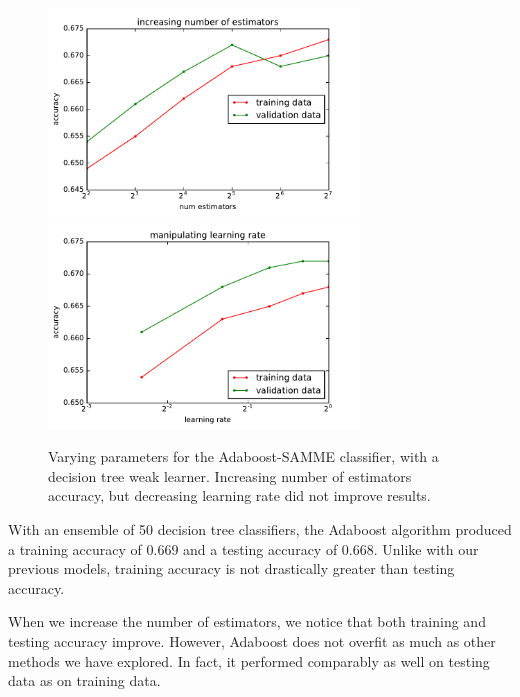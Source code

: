 \documentclass{article}
\newcommand\halfwidth{3.25in}
\begin{document}
\begin{multicols}{2}
\begin{figure}[t]
   \centering
   \includegraphics[width=\halfwidth]{img/adaB-numEstimators.pdf}\hspace{-.1in}
   \includegraphics[width=\halfwidth]{img/adaB-learningRate.pdf}
   \caption{Varying parameters for the Adaboost-SAMME classifier,
   with a decision tree weak learner.
   Increasing number of estimators accuracy,
   but decreasing learning rate did not improve results.
   }
   \label{fig:adaB-params}
\end{figure}

With an ensemble of 50 decision tree classifiers,
the Adaboost algorithm produced
a training accuracy of 0.669
and a testing accuracy of 0.668.
Unlike with our previous models,
training accuracy is not drastically greater than
testing accuracy.

When we increase the number of estimators,
we notice that both training and testing accuracy improve.
However, Adaboost does not overfit
as much as other methods we have explored.
In fact, it performed comparably as well on testing data
as on training data.


\end{multicols}
\end{document}
